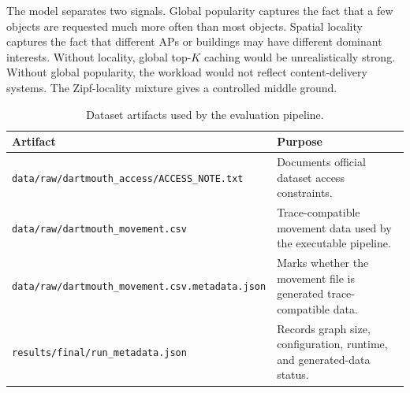 The model separates two signals. Global popularity captures the fact that a few objects are requested much more often than most objects. Spatial locality captures the fact that different APs or buildings may have different dominant interests. Without locality, global top-\(K\) caching would be unrealistically strong. Without global popularity, the workload would not reflect content-delivery systems. The Zipf-locality mixture gives a controlled middle ground.

\begin{table}[t]
\centering
\caption{Dataset artifacts used by the evaluation pipeline.}
\label{tab:data_artifacts}
\begin{tabular}{p{}p{}}
\toprule
Artifact & Purpose \\
\midrule
\texttt{data/raw/dartmouth\_access/ACCESS\_NOTE.txt} & Documents official dataset access constraints. \\
\texttt{data/raw/dartmouth\_movement.csv} & Trace-compatible movement data used by the executable pipeline. \\
\texttt{data/raw/dartmouth\_movement.csv.metadata.json} & Marks whether the movement file is generated trace-compatible data. \\
\texttt{results/final/run\_metadata.json} & Records graph size, configuration, runtime, and generated-data status. \\
\bottomrule
\end{tabular}
\end{table}
